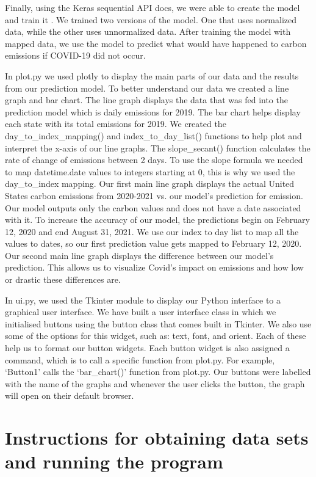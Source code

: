 \documentclass[fontsize=11pt]{article}
\begin{document}
Finally, using the Keras sequential API docs, we were able to create the model and train it \cite{team}. We trained two versions of the model. One that uses normalized data, while the other uses unnormalized data. After training the model with mapped data, we use the model to predict what would have happened to carbon emissions if COVID-19 did not occur.

In plot.py we used plotly to display the main parts of our data and the results from our prediction model. To better understand our data we created a line graph and bar chart. The line graph displays the data that was fed into the prediction model which is daily emissions for 2019. The bar chart helps display each state with its total emissions for 2019. We created the day\_to\_index\_mapping() and index\_to\_day\_list() functions to help plot and interpret the x-axis of our line graphs. The slope\_secant() function calculates the rate of change of emissions between 2 days. To use the slope formula we needed to map datetime.date values to integers starting at 0, this is why we used the day\_to\_index mapping. Our first main line graph displays the actual United States carbon emissions from 2020-2021 vs. our model’s prediction for emission. Our model outputs only the carbon values and does not have a date associated with it. To increase the accuracy of our model, the predictions begin on February 12, 2020 and end August 31, 2021. We use our index to day list to map all the values to dates, so our first prediction value gets mapped to February 12, 2020. Our second main line graph displays the difference between our model’s prediction. This allows us to visualize Covid’s impact on emissions and how low or drastic these differences are.

In ui.py, we used the Tkinter module to display our Python interface to a graphical user interface. We have built a user interface class in which we initialised buttons using the button class that comes built in Tkinter. We also use some of the options for this widget, such as: text, font, and orient. Each of these help us to format our button widgets. Each button widget is also assigned a command, which is to call a specific function from plot.py. For example, ‘Button1’ calls the ‘bar\_chart()’ function from plot.py. Our buttons were labelled with the name of the graphs and whenever the user clicks the button, the graph will open on their default browser.


\section{Instructions for obtaining data sets and running the program}
\end{document}
